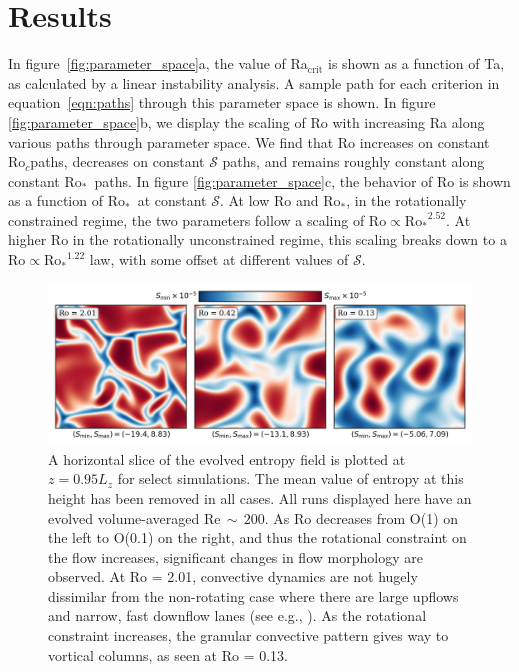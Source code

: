 \documentclass[twocolumn, amsmath, amsfonts, amssymb]{aastex62}
\newcommand{\grad}{\ensuremath{\nabla}}
\newcommand{\pro}{\ensuremath{\text{Ro}_{\text{*}}}}
\newcommand{\con}{\ensuremath{\text{Ro}_{c}}}
\begin{document}


\section{Results}
\label{sec:results}
In figure~\ref{fig:parameter_space}a, the value of Ra$_{\text{crit}}$
is shown as a function of Ta, as
calculated by a linear instability analysis. A sample path for
each criterion in equation~\ref{eqn:paths} through
this parameter space is shown.
In figure \ref{fig:parameter_space}b, we display the scaling of Ro
with increasing Ra along various paths through parameter space.
We find that Ro increases on constant \con paths, decreases on constant $\mathcal{S}$
paths, and remains roughly constant along constant \pro$\,$ paths.
In figure \ref{fig:parameter_space}c, the behavior of Ro is shown as
a function of \pro$\,$ at constant $\mathcal{S}$.
At low Ro and \pro, in the rotationally constrained regime, the two parameters
follow a scaling of $\text{Ro}\propto\pro^{2.52}$.
At higher Ro in the rotationally unconstrained regime, this scaling breaks down
to a $\text{Ro}\propto\pro^{1.22}$ law, with some offset at different values of $\mathcal{S}$.

\begin{figure}[t]
    \includegraphics[width=\textwidth]{dynamics_plot.png}
    \caption{ A horizontal slice of the evolved entropy field is plotted at $z = 0.95L_z$
    for select simulations. The mean value of entropy at this height has been removed in all
    cases. All runs displayed here have an evolved volume-averaged Re$\,\sim\,200$. 
    As Ro decreases from O(1) on the left to O(0.1) on the right, and thus the rotational
    constraint on the flow increases, significant changes in flow morphology are observed.
    At Ro = 2.01, convective dynamics are not hugely dissimilar from the non-rotating
    case where there are large upflows and narrow, fast downflow lanes (see e.g., \AB).
    As the rotational constraint increases, the granular convective pattern gives way
    to vortical columns, as seen at Ro = 0.13.
    \label{fig:pretty_convection} }
\end{figure}
\end{document}
